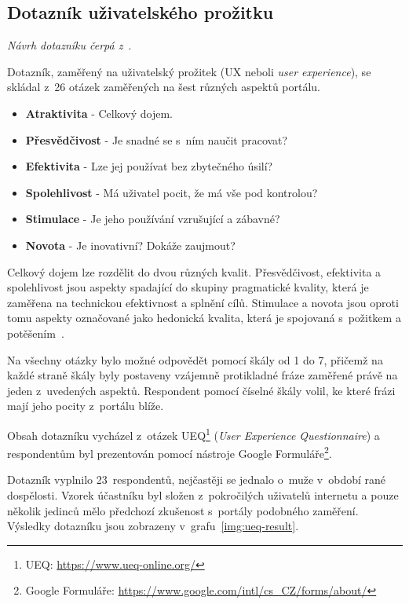 \subsection{Dotazník uživatelského prožitku}
\emph{Návrh dotazníku čerpá z~\cite{bib:ueq}}.

Dotazník, zaměřený na uživatelský prožitek (UX neboli \emph{user experience}), se skládal z~26 otázek zaměřených na šest různých aspektů portálu.
\begin{itemize}
    \item \textbf{Atraktivita} - Celkový dojem.
    \item \textbf{Přesvědčivost} - Je snadné se s~ním naučit pracovat?
    \item \textbf{Efektivita} - Lze jej používat bez zbytečného úsilí?
    \item \textbf{Spolehlivost} - Má uživatel pocit, že má vše pod kontrolou?
    \item \textbf{Stimulace} - Je jeho používání vzrušující a zábavné?
    \item \textbf{Novota} - Je inovativní? Dokáže zaujmout?
\end{itemize}
Celkový dojem lze rozdělit do dvou různých kvalit. Přesvědčivost, efektivita a spolehlivost jsou aspekty spadající do skupiny pragmatické kvality, která je zaměřena na technickou efektivnost a splnění cílů. Stimulace a novota jsou oproti tomu aspekty označované jako hedonická kvalita, která je spojovaná s~požitkem a potěšením~\cite{bib:hedonic}.

Na všechny otázky bylo možné odpovědět pomocí škály od 1 do 7, přičemž na každé straně škály byly postaveny vzájemně protikladné fráze zaměřené právě na jeden z~uvedených aspektů. Respondent pomocí číselné škály volil, ke které frázi mají jeho pocity z~portálu blíže.

Obsah dotazníku vycházel z~otázek UEQ\footnote{UEQ: \url{https://www.ueq-online.org/}} (\emph{User Experience Questionnaire}) a respondentům byl prezentován pomocí nástroje Google Formuláře\footnote{Google Formuláře: \url{https://www.google.com/intl/cs_CZ/forms/about/}}.

Dotazník vyplnilo 23~respondentů, nejčastěji se jednalo o~muže v~období rané dospělosti. Vzorek účastníku byl složen z~pokročilých uživatelů internetu a pouze několik jedinců mělo předchozí zkušenost s~portály podobného zaměření. Výsledky dotazníku jsou zobrazeny v~grafu~\ref{img:ueq-result}.


